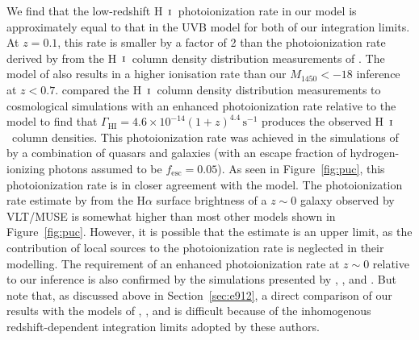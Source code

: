 \documentclass[fleqn,usenatbib]{mnras}
\def\HI{\hbox{H~$\scriptstyle\rm I$}}
\begin{document}
We find that the low-redshift \HI\ photoionization rate in our model
is approximately equal to that in the \citet{2012ApJ...746..125H} UVB
model for both of our integration limits.  At $z=0.1$, this rate is
smaller by a factor of 2 than the photoionization rate derived by
\citet{2017MNRAS.467.3172G} from the \HI\ column density distribution
measurements of \citet{2016ApJ...817..111D}.  The model of
\citet{2015ApJ...813L...8M} also results in a higher ionisation rate
than our $M_{1450}<-18$ inference at $z<0.7$.
\citet{2015ApJ...811....3S} compared the \HI\ column density
distribution measurements to cosmological simulations with an enhanced
photoionization rate relative to the \citet{2012ApJ...746..125H} model
to find that $\Gamma_\mathrm{HI}=4.6\times
10^{-14}(1+z)^{4.4}\,\mathrm{s}^{-1}$ produces the observed
\HI\ column densities.  This photoionization rate was achieved in the
simulations of \citet{2015ApJ...811....3S} by a combination of quasars
and galaxies (with an escape fraction of hydrogen-ionizing photons
assumed to be $f_\mathrm{esc}=0.05$).  As seen in
Figure~\ref{fig:puc}, this photoionization rate is in closer agreement
with the \citet{2015ApJ...813L...8M} model.  The photoionization rate
estimate by \citet{2017MNRAS.467.4802F} from the H$\alpha$ surface
brightness of a $z\sim 0$ galaxy observed by VLT/MUSE is somewhat
higher than most other models shown in Figure~\ref{fig:puc}.  However,
it is possible that the \citet{2017MNRAS.467.4802F} estimate is an
upper limit, as the contribution of local sources to the
photoionization rate is neglected in their modelling.  The requirement
of an enhanced photoionization rate at $z\sim 0$ relative to our
inference is also confirmed by the simulations presented by
\citet{2017MNRAS.467L..86V}, \citet{2017ApJ...837..106O}, and
\citet{2018arXiv180104931P}.  But note that, as discussed above in
Section~\ref{sec:e912}, a direct comparison of our results with the
models of \citet{2015ApJ...813L...8M}, \citet{2015MNRAS.451L..30K},
and \citet{2018arXiv180104931P} is difficult because of the
inhomogenous redshift-dependent integration limits adopted by these
authors.
\end{document}
